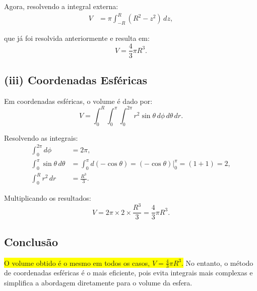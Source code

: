 \documentclass[a4paper,12pt]{article}
\begin{document}
\begin{flushleft}
Agora, resolvendo a integral externa:
\begin{align*}
V &= \pi \int_{-R}^{R} (R^2 - z^2) \, dz,
\end{align*}

que já foi resolvida anteriormente e resulta em:
\begin{equation}
V = \frac{4}{3} \pi R^3.
\end{equation}

\subsection*{(iii) Coordenadas Esféricas}
Em coordenadas esféricas, o volume é dado por:
\begin{equation}
V = \int_0^R \int_0^{\pi} \int_0^{2\pi} r^2 \sin \theta \, d\phi \, d\theta \, dr.
\end{equation}

Resolvendo as integrais:
\begin{align*}
\int_0^{2\pi} d\phi &= 2\pi, \\
\int_0^{\pi} \sin\theta \, d\theta &= \int_0^{\pi} d(-\cos\theta) = (-\cos\theta) \Big|_0^{\pi} = (1 + 1) = 2, \\
\int_0^R r^2 \, dr &= \frac{R^3}{3}.
\end{align*}

Multiplicando os resultados:
\begin{equation}
V = 2\pi \times 2 \times \frac{R^3}{3} = \frac{4}{3} \pi R^3.
\end{equation}

\subsection*{Conclusão}
\colorbox{yellow}{O volume obtido é o mesmo em todos os casos, $V = \frac{4}{3} \pi R^3$.} No entanto, o método de coordenadas esféricas 
é o mais eficiente, pois evita integrais mais complexas e simplifica a abordagem diretamente para o volume da esfera.
\end{flushleft}
\end{document}

